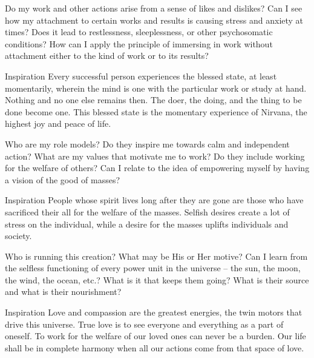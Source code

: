 \newpage
\begin{mananam}{} 
\mananamtext Do my work and other actions arise from a sense of likes and dislikes? Can I see how my attachment to certain works and results is causing stress and anxiety at times? Does it lead to restlessness, sleeplessness, or other psychosomatic conditions? How can I apply the principle of immersing in work without attachment either to the kind of work or to its results?
\end{mananam}
\WritingHand{}
\begin{inspiration}{\mananamfont Inspiration}
\mananamtext Every successful person experiences the blessed state, at least momentarily, wherein the mind is one with the particular work or study at hand. Nothing and no one else remains then. The doer, the doing, and the thing to be done become one. This blessed state is the momentary experience of Nirvana, the highest joy and peace of life.
\end{inspiration}
\newpage


\newpage
\begin{mananam}{} 
\mananamtext Who are my role models? Do they inspire me towards calm and independent action? What are my values that motivate me to work? Do they include working for the welfare of others? Can I relate to the idea of empowering myself by having a vision of the good of masses?
\end{mananam}
\WritingHand{}
\begin{inspiration}{\mananamfont Inspiration}
\mananamtext People whose spirit lives long after they are gone are those who have sacrificed their all for the welfare of the masses. Selfish desires create a lot of stress on the individual, while a desire for the masses uplifts individuals and society.
\end{inspiration}
\newpage


\newpage
\begin{mananam}{} 
\mananamtext Who is running this creation? What may be His or Her motive? Can I learn from the selfless functioning of every power unit in the universe – the sun, the moon, the wind, the ocean, etc.? What is it that keeps them going? What is their source and what is their nourishment? 
\end{mananam}
\WritingHand{}
\begin{inspiration}{\mananamfont Inspiration}
\mananamtext Love and compassion are the greatest energies, the twin motors that drive this universe. True love is to see everyone and everything as a part of oneself. To work for the welfare of our loved ones can never be a burden. Our life shall be in complete harmony when all our actions come from that space of love.
\end{inspiration}
\newpage

